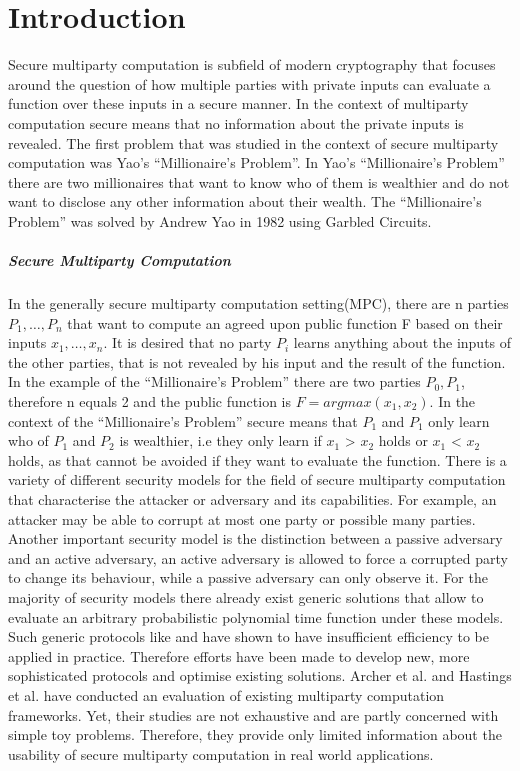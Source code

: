 \chapter {Introduction}
Secure multiparty computation is subfield of modern cryptography that focuses around the question of how multiple parties with private inputs can evaluate a function over these inputs in a secure manner. In the context of multiparty computation secure means that no information about the private inputs is revealed. The first problem that was studied in the context of secure multiparty computation was Yao's ``Millionaire’s Problem''. In Yao's ``Millionaire’s Problem'' there are two millionaires that want to know who of them is wealthier and do not want to disclose any other information about their wealth. The ``Millionaire’s Problem'' was solved by Andrew Yao in 1982 \cite{4568388} using Garbled Circuits.
\paragraph{Secure Multiparty Computation}
In the generally secure multiparty computation setting(MPC), there are n parties $ P_1,\dots,P_{n} $ that want to compute an agreed upon public function F based on their inputs $ x_1,\dots,x_{n}$. It is desired that no party $P_i$ learns anything about the inputs of the other parties, that is not revealed by his input and the result of the function. In the example of the ``Millionaire’s Problem'' there are two parties $P_0,P_1 $, therefore n equals 2 and the public function is $F=argmax(x_1,x_2)$. In the context of the ``Millionaire’s Problem'' secure means that $P_1$ and $P_1$ only learn who of $P_1$ and $P_2$ is wealthier, i.e they only learn if $x_1$ > $x_2$ holds or $x_1$ < $x_2$ holds, as that cannot be avoided if they want to evaluate the function. 
There is a variety of different security models for the field of secure multiparty computation that characterise the attacker or adversary and its capabilities. For example, an attacker may be able to corrupt at most one party or possible many parties. Another important security model is the distinction between a passive adversary and an active adversary, an active adversary is allowed to force a corrupted party to change its behaviour, while a passive adversary can only observe it. 
For the majority of security models there already exist generic solutions that allow to evaluate an arbitrary probabilistic polynomial time function under these models. Such generic protocols like \cite{DBLP:conf/crypto/WigdersonD82} and \cite{4568388} have shown to have insufficient efficiency to be applied in practice. Therefore efforts have been made to develop new, more sophisticated protocols and optimise existing solutions.
Archer et al. \cite{Archer2018FromKT} and Hastings et al. \cite{hastings2019sok} have conducted an evaluation of existing multiparty computation frameworks. Yet, their studies are not exhaustive and are partly concerned with simple toy problems.
Therefore, they provide only limited information about the usability of secure multiparty computation in real world applications.  
